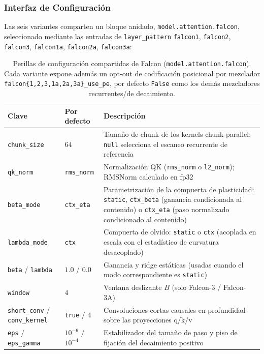 \subsubsection{Interfaz de Configuración}

Las seis variantes comparten un bloque anidado, \texttt{model.attention.falcon}, seleccionado mediante las entradas de \texttt{layer\_pattern} \texttt{falcon1}, \texttt{falcon2}, \texttt{falcon3}, \texttt{falcon1a}, \texttt{falcon2a}, \texttt{falcon3a}:

\begin{table}[H]
\centering
\small
\begin{tabularx}{0.95\linewidth}{llX}
\toprule
\textbf{Clave} & \textbf{Por defecto} & \textbf{Descripción} \\
\midrule
\texttt{chunk\_size} & $64$ & Tamaño de chunk de los kernels chunk-parallel; \texttt{null} selecciona el escaneo recurrente de referencia \\
\texttt{qk\_norm} & \texttt{rms\_norm} & Normalización QK (\texttt{rms\_norm} o \texttt{l2\_norm}); RMSNorm calculado en fp32 \\
\texttt{beta\_mode} & \texttt{ctx\_eta} & Parametrización de la compuerta de plasticidad: \texttt{static}, \texttt{ctx\_beta} (ganancia condicionada al contenido) o \texttt{ctx\_eta} (paso normalizado condicionado al contenido) \\
\texttt{lambda\_mode} & \texttt{ctx} & Compuerta de olvido: \texttt{static} o \texttt{ctx} (acoplada en escala con el estadístico de curvatura desacoplado) \\
\texttt{beta} / \texttt{lambda} & $1.0$ / $0.0$ & Ganancia y ridge estáticas (usadas cuando el modo correspondiente es \texttt{static}) \\
\texttt{window} & $4$ & Ventana deslizante $B$ (solo Falcon-3 / Falcon-3A) \\
\texttt{short\_conv} / \texttt{conv\_kernel} & \texttt{true} / $4$ & Convoluciones cortas causales en profundidad sobre las proyecciones q/k/v \\
\texttt{eps} / \texttt{eps\_gamma} & $10^{-6}$ / $10^{-4}$ & Estabilizador del tamaño de paso y piso de fijación del decaimiento positivo \\
\bottomrule
\end{tabularx}
\caption{Perillas de configuración compartidas de Falcon (\texttt{model.attention.falcon}). Cada variante expone además un opt-out de codificación posicional por mezclador \texttt{falcon\{1,2,3,1a,2a,3a\}\_use\_pe}, por defecto \texttt{False} como los demás mezcladores recurrentes/de decaimiento.}
\label{tab:falcon-knobs}
\end{table}

